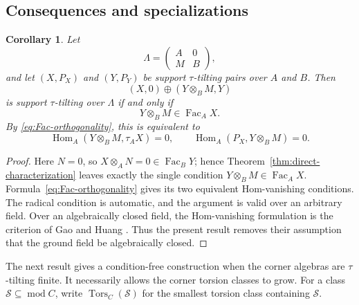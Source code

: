 \documentclass[11pt,reqno]{amsart}
\newtheorem{corollary}[theorem]{Corollary}
\theoremstyle{definition}
\theoremstyle{remark}
\newcommand{\modu}{\operatorname{mod}}
\newcommand{\Fac}{\operatorname{Fac}}
\newcommand{\Hom}{\operatorname{Hom}}
\numberwithin{equation}{section}
\begin{document}
\subsection{Consequences and specializations}

\begin{corollary}\label{cor:triangular-direct}
Let
\[
 \Lambda=\begin{pmatrix}A&0\\M&B\end{pmatrix},
\]
and let $(X,P_X)$ and $(Y,P_Y)$ be support $\tau$-tilting pairs over $A$
and $B$.  Then
\[
 (X,0)\oplus(Y\otimes_BM,Y)
\]
is support $\tau$-tilting over $\Lambda$ if and only if
\[
 Y\otimes_BM\in\Fac_AX.
\]
By \eqref{eq:Fac-orthogonality}, this is equivalent to
\[
 \Hom_A(Y\otimes_BM,\tau_AX)=0,
 \qquad
 \Hom_A(P_X,Y\otimes_BM)=0.
\]
\end{corollary}

\begin{proof}
Here $N=0$, so $X\otimes_AN=0\in\Fac_BY$; hence
Theorem~\ref{thm:direct-characterization} leaves exactly the single condition
$Y\otimes_BM\in\Fac_AX$.  Formula~\eqref{eq:Fac-orthogonality} gives its two
equivalent Hom-vanishing conditions.  The radical condition is automatic,
and the argument is valid over an arbitrary field.  Over an algebraically
closed field, the Hom-vanishing formulation is the criterion of Gao and
Huang \cite[Theorem~4.3]{GaoHuang}.  Thus the present result removes their
assumption that the ground field be algebraically closed.
\end{proof}

The next result gives a condition-free construction when the corner algebras
are $\tau$-tilting finite.  It necessarily allows the corner torsion classes
to grow.  For a class $\mathcal S\subseteq\modu C$, write
$\operatorname{Tors}_C(\mathcal S)$ for the smallest torsion class containing
$\mathcal S$.
\end{document}
